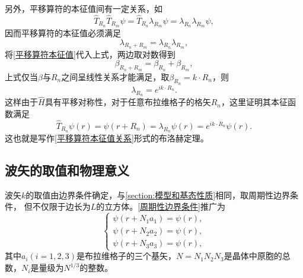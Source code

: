             另外，平移算符的本征值间有一定关系，如
            \begin{equation}
                \hat{T}_{R_n}\hat{T}_{R_m}\psi=\hat{T}_{R_n}\lambda_{R_m}\psi=\lambda_{R_n}\lambda_{R_m}\psi,
            \end{equation}
            因而平移算符的本征值必须满足
            \begin{equation}
                \lambda_{R_n+R_m}=\lambda_{R_n}\lambda_{R_m}\label{平移算符本征值关系},
            \end{equation}
            将\autoref{平移算符本征值}代入上式，两边取对数得到
            \begin{equation}
                \beta_{R_n+R_m}=\beta_{R_n}+\beta_{R_m},
            \end{equation}
            上式仅当$\beta$与$R_n$之间呈线性关系才能满足，取$\beta_{R_n}=k\cdot R_{n}$，则
            \begin{equation}
                \lambda_{R_n}=e^{ik\cdot R_n}.
            \end{equation}
            这样由于$\hat{H}$具有平移对称性，对于任意布拉维格子的格矢$R_n$，这里证明其本征函数满足
            \begin{equation}
                \hat{T}_{R_n}\psi(r)=\psi(r+R_n)=\lambda_{R_n}\psi(r)=e^{ik\cdot R_n}\psi(r).
            \end{equation}
            这也就是写作\autoref{平移算符本征值关系}形式的布洛赫定理。

        \subsection{波矢的取值和物理意义}\label{subsection:波矢k的取值和物理意义}
            波矢$k$的取值由边界条件确定，与\autoref{section:模型和基态性质}相同，取周期性边界条件，
            但不仅限于边长为$L$的立方体。\autoref{周期性边界条件}推广为
            \begin{equation}
                \left\{
                    \begin{aligned}
                        \psi(r+N_1a_1)=\psi(r),\\
                        \psi(r+N_2a_2)=\psi(r),\\
                        \psi(r+N_3a_3)=\psi(r),
                    \end{aligned}\label{推广的周期性边界条件}\right.
            \end{equation}
            其中$a_i(i=1,2,3)$是布拉维格子的三个基矢，$N=N_1N_2N_3$是晶体中原胞的总数，$N_i$是量级为$N^{1/3}$的整数。

